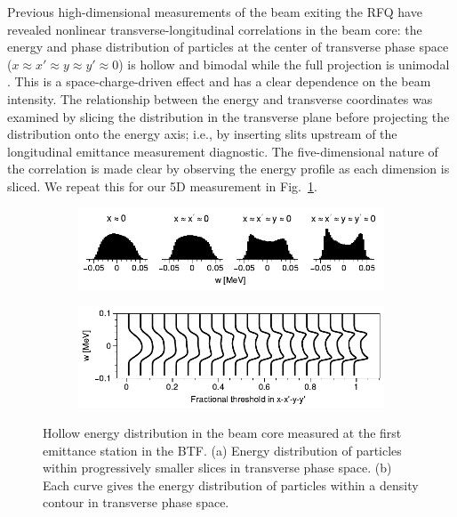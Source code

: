 \documentclass[letterpaper,
               keeplastbox,
               nospread,
               biblatex,
              ]{jacow}
\begin{document}
Previous high-dimensional measurements of the beam exiting the RFQ have revealed nonlinear transverse-longitudinal correlations in the beam core: the energy and phase distribution of particles at the center of transverse phase space ($x \approx x' \approx y \approx y' \approx 0$) is hollow and bimodal while the full projection is unimodal \cite{Cathey2018}. This is a space-charge-driven effect \cite{Ruisard2021-hollow} and has a clear dependence on the beam intensity. The relationship between the energy and transverse coordinates was examined by slicing the distribution in the transverse plane before projecting the distribution onto the energy axis; i.e., by inserting slits upstream of the longitudinal emittance measurement diagnostic. The five-dimensional nature of the correlation is made clear by observing the energy profile as each dimension is sliced. We repeat this for our 5D measurement in Fig.~\ref{fig:hollow_a}.
%
\begin{figure}[!t]
    \centering
    \begin{subfigure}{\columnwidth}
        \includegraphics[width=\textwidth]{w_slices.pdf}
        \caption{}
        \label{fig:hollow_a}
    \end{subfigure}
    \begin{subfigure}{\columnwidth}
        \includegraphics[width=\textwidth]{4Dcontour_dE2.pdf}
        \caption{}
        \label{fig:hollow_b}
    \end{subfigure}
    \caption{Hollow energy distribution in the beam core measured at the first emittance station in the BTF. (a) Energy distribution of particles within progressively smaller slices in transverse phase space. (b) Each curve gives the energy distribution of particles within a density contour in transverse phase space.}
    \label{fig:hollow}
\end{figure}
%
\end{document}
